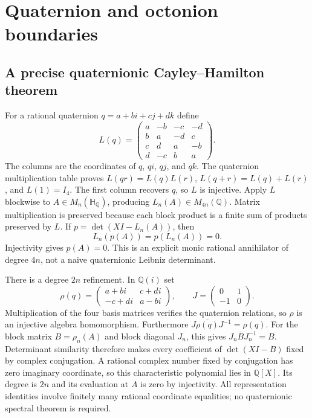 \section{Quaternion and octonion boundaries}

\subsection{A precise quaternionic Cayley--Hamilton theorem}

For a rational quaternion $q=a+bi+cj+dk$ define
\[
 L(q)=\begin{pmatrix}
 a&-b&-c&-d\\
 b&a&-d&c\\
 c&d&a&-b\\
 d&-c&b&a
 \end{pmatrix}.
\]
The columns are the coordinates of $q$, $qi$, $qj$, and $qk$.
The quaternion multiplication table proves
$L(qr)=L(q)L(r)$, $L(q+r)=L(q)+L(r)$, and $L(1)=I_4$.
The first column recovers $q$, so $L$ is injective.
Apply $L$ blockwise to $A\in M_n(\mathbb H_{\mathbb Q})$, producing
$L_n(A)\in M_{4n}(\mathbb Q)$. Matrix multiplication is preserved because
each block product is a finite sum of products preserved by $L$.
If $p=\det(XI-L_n(A))$, then
\[
 L_n(p(A))=p(L_n(A))=0.
\]
Injectivity gives $p(A)=0$. This is an explicit monic rational
annihilator of degree $4n$, not a naive quaternionic Leibniz determinant.

There is a degree $2n$ refinement. In $\mathbb Q(i)$ set
\[
 \rho(q)=\begin{pmatrix}a+bi&c+di\\-c+di&a-bi\end{pmatrix},\qquad
 J=\begin{pmatrix}0&1\\-1&0\end{pmatrix}.
\]
Multiplication of the four basis matrices verifies the quaternion
relations, so $\rho$ is an injective algebra homomorphism. Furthermore
$J\overline{\rho(q)}J^{-1}=\rho(q)$. For the block matrix
$B=\rho_n(A)$ and block diagonal $J_n$, this gives
$J_n\overline B J_n^{-1}=B$. Determinant similarity therefore makes
every coefficient of $\det(XI-B)$ fixed by complex conjugation.
A rational complex number fixed by conjugation has zero imaginary
coordinate, so this characteristic polynomial lies in $\mathbb Q[X]$.
Its degree is $2n$ and its evaluation at $A$ is zero by injectivity.
All representation identities involve finitely many rational coordinate
equalities; no quaternionic spectral theorem is required.

